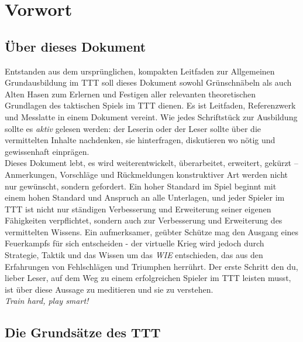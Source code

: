 \section{Vorwort}
\subsection{Über dieses Dokument}
Entstanden aus dem ursprünglichen, kompakten Leitfaden zur Allgemeinen Grundausbildung im \ac{TTT} soll dieses Dokument sowohl Grünschnäbeln als auch Alten Hasen zum Erlernen und Festigen aller relevanten theoretischen Grundlagen des taktischen Spiels im \ac{TTT} dienen. Es ist Leitfaden, Referenzwerk und Messlatte in einem Dokument vereint. Wie jedes Schriftstück zur Ausbildung sollte es \textit{aktiv} gelesen werden: der Leserin oder der Leser sollte über die vermittelten Inhalte nachdenken, sie hinterfragen, diskutieren wo nötig und gewissenhaft einprägen.\\
Dieses Dokument lebt, es wird weiterentwickelt, überarbeitet, erweitert, gekürzt -- Anmerkungen, Vorschläge und Rückmeldungen konstruktiver Art werden nicht nur gewünscht, sondern gefordert. Ein hoher Standard im Spiel beginnt mit einem hohen Standard und Anspruch an alle Unterlagen, und jeder Spieler im \ac{TTT} ist nicht nur ständigen Verbesserung und Erweiterung seiner eigenen Fähigkeiten verpflichtet, sondern auch zur Verbesserung und Erweiterung des vermittelten Wissens. Ein aufmerksamer, geübter Schütze mag den Ausgang eines Feuerkampfs für sich entscheiden - der virtuelle Krieg wird jedoch durch Strategie, Taktik und das Wissen um das \textit{WIE} entschieden, das aus den Erfahrungen von Fehlschlägen und Triumphen herrührt. Der erste Schritt den du, lieber Leser, auf dem Weg zu einem erfolgreichen Spieler im \ac{TTT} leisten musst, ist über diese Aussage zu meditieren und sie zu verstehen.\\
\newline
\textit{Train hard, play smart!}

\newpage
\subsection{Die Grundsätze des TTT}
